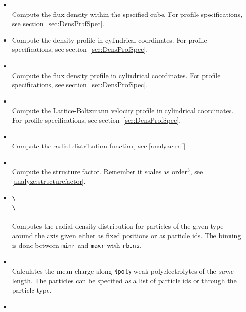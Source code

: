 \begin{itemize}
    \item {}    \\
          Compute the flux density within the specified cube.
          For profile specifications, see section~\ref{sec:DensProfSpec}.
    \item {}
        Compute the density profile in cylindrical coordinates.
          For profile specifications, see section~\ref{sec:DensProfSpec}.
    \item {} \\
        Compute the flux density profile in cylindrical coordinates.
          For profile specifications, see section~\ref{sec:DensProfSpec}.
    \item {} \\
        Compute the Lattice-Boltzmann velocity profile in cylindrical coordinates.
          For profile specifications, see section~\ref{sec:DensProfSpec}.
    \item {} \\
        Compute the radial distribution function, see \ref{analyze:rdf}.
    \item {} \\
        Compute the structure factor. Remember it scales as order$^3$, see \ref{analyze:structurefactor}.
	\item {} \verb!\! \\
		\verb!\!\\
		 \\
		Computes the radial density distribution for particles of the given type around the axis
		given either as fixed positions or as particle ids. The binning is done
		between \verb!minr! and \verb!maxr! with \verb!rbins!. 
	\item {}  \\
		Calculates the mean charge along \verb!Npoly! weak polyelectrolytes of the \emph{same}
		length. The particles can be specified as a list of particle ids or through
		the particle type. 
	\item {} 
\end{itemize}
